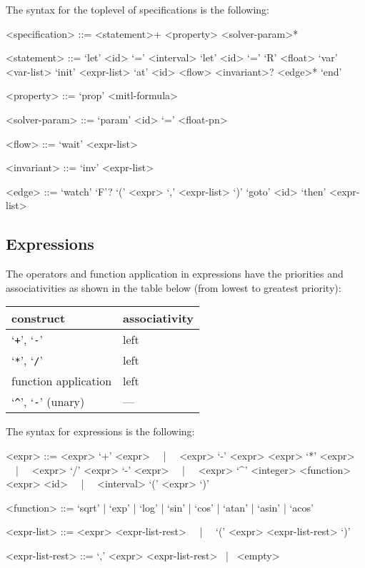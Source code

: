 \documentclass[10pt,a4paper]{article}
\begin{document}
The syntax for the toplevel of specifications is the following:
\begin{grammar}
<specification> ::= <statement>+ <property> <solver-param>*

<statement> ::= 
`let' <id> `=' <interval>
\alt `let' <id> `=' `R' <float>
\alt `var' <var-list>
\alt `init' <expr-list>
\alt `at' <id> <flow> <invariant>? <edge>* `end'

<property> ::= `prop' <mitl-formula>

<solver-param> ::= `param' <id> `=' <float-pn>


<flow> ::= `wait' <expr-list>

<invariant> ::= `inv' <expr-list>

<edge> ::= `watch' `F'? `(' <expr> `,' <expr-list> `)' `goto' <id> `then' <expr-list>
\end{grammar}


\subsection{Expressions}

The operators and function application in expressions have the priorities and associativities as shown in the table below (from lowest to greatest priority):
\begin{table}[ht]
	\centering
    \begin{tabular}{|l|l|} \hline
		construct & associativity \\
		\hline
		`\texttt{+}', `\texttt{-}' & left \\
		`\texttt{*}', `\texttt{/}' & left \\
		function application & left \\
		`\texttt{\^}', `\texttt{-}' (unary) & --- \\
		\hline
	\end{tabular}
\end{table}

The syntax for expressions is the following:
\begin{grammar}
<expr> ::= <expr> `+' <expr> ~~|~~ <expr> `-' <expr>
\alt <expr> `*' <expr> ~~|~~ <expr> `/' <expr>
\alt `-' <expr> ~~|~~ <expr> `^' <integer>
\alt <function> <expr>
\alt <id> ~~|~~ <interval>
\alt `(' <expr> `)' 

<function> ::= `sqrt' | `exp' | `log' | `sin' | `cos' | `atan' | `asin' | `acos'

<expr-list> ::= <expr> <expr-list-rest> ~~|~~ `(' <expr> <expr-list-rest> `)'

<expr-list-rest> ::= `,' <expr> <expr-list-rest> ~|~ <empty>
\end{grammar}
\end{document}
